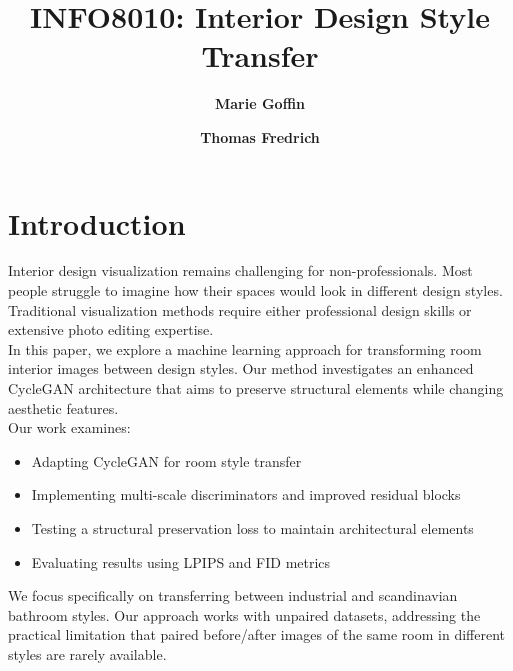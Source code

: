 \documentclass[twocolumn,superscriptaddress,aps]{revtex4-1}
\begin{document}

\title{\Large{INFO8010: Interior Design Style Transfer}}
\vspace{1cm}
\author{\small{\bf Marie Goffin}}
\author{\small{\bf Thomas Fredrich}}

\maketitle


\section{Introduction}

Interior design visualization remains challenging for non-professionals. Most people struggle to imagine how their spaces would look in different design styles. Traditional visualization methods require either professional design skills or extensive photo editing expertise.\\

In this paper, we explore a machine learning approach for transforming room interior images between design styles. Our method investigates an enhanced CycleGAN architecture that aims to preserve structural elements while changing aesthetic features.\\

Our work examines:

\begin{itemize}
    \item Adapting CycleGAN for room style transfer
    \item Implementing multi-scale discriminators and improved residual blocks 
    \item Testing a structural preservation loss to maintain architectural elements
    \item Evaluating results using LPIPS and FID metrics
\end{itemize}

We focus specifically on transferring between industrial and scandinavian bathroom styles. Our approach works with unpaired datasets, addressing the practical limitation that paired before/after images of the same room in different styles are rarely available.
\end{document}
